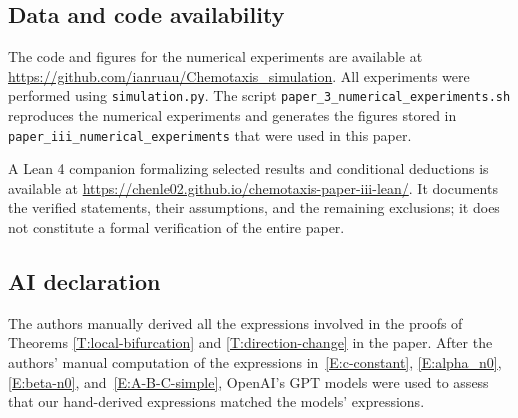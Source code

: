 \documentclass[11pt]{article} %
\theoremstyle{remark}
\theoremstyle{remark}
\numberwithin{equation}{section}
\numberwithin{figure}{section}
\numberwithin{table}{section}
\begin{document}
\subsection*{Data and code availability}
The code and figures for the numerical experiments are available at
\url{https://github.com/ianruau/Chemotaxis_simulation}. All experiments were
performed using \texttt{simulation.py}. The script
\texttt{paper\_3\_numerical\_experiments.sh} reproduces the numerical
experiments and generates the figures stored in
\texttt{paper\_iii\_numerical\_experiments} that were used in this paper.

A Lean 4 companion formalizing selected results and conditional deductions is
available at \url{https://chenle02.github.io/chemotaxis-paper-iii-lean/}.
It documents the verified statements, their assumptions, and the remaining
exclusions; it does not constitute a formal verification of the entire paper.

\subsection*{AI declaration}
The authors manually derived all the expressions involved in  the proofs of
Theorems  \ref{T:local-bifurcation} and \ref{T:direction-change}  in the paper.
After the authors' manual computation of the expressions
in~\eqref{E:c-constant}, \eqref{E:alpha_n0}, \eqref{E:beta-n0},
and~\eqref{E:A-B-C-simple}, OpenAI's GPT models were used to assess that our
hand-derived expressions matched the models' expressions.




{}

\end{document}
